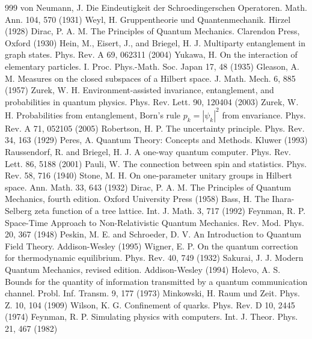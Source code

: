 \begin{thebibliography}{999}
 von Neumann, J. Die Eindeutigkeit der Schroedingerschen Operatoren. Math. Ann. 104, 570 (1931)
 Weyl, H. Gruppentheorie und Quantenmechanik. Hirzel (1928)
 Dirac, P. A. M. The Principles of Quantum Mechanics. Clarendon Press, Oxford (1930)
 Hein, M., Eisert, J., and Briegel, H. J. Multiparty entanglement in graph states. Phys. Rev. A 69, 062311 (2004)
 Yukawa, H. On the interaction of elementary particles. I. Proc. Phys.-Math. Soc. Japan 17, 48 (1935)
 Gleason, A. M. Measures on the closed subspaces of a Hilbert space. J. Math. Mech. 6, 885 (1957)
 Zurek, W. H. Environment-assisted invariance, entanglement, and probabilities in quantum physics. Phys. Rev. Lett. 90, 120404 (2003)
 Zurek, W. H. Probabilities from entanglement, Born's rule $p_k=|\psi_k|^2$ from envariance. Phys. Rev. A 71, 052105 (2005)
 Robertson, H. P. The uncertainty principle. Phys. Rev. 34, 163 (1929)
 Peres, A. Quantum Theory: Concepts and Methods. Kluwer (1993)
 Raussendorf, R. and Briegel, H. J. A one-way quantum computer. Phys. Rev. Lett. 86, 5188 (2001)
 Pauli, W. The connection between spin and statistics. Phys. Rev. 58, 716 (1940)
 Stone, M. H. On one-parameter unitary groups in Hilbert space. Ann. Math. 33, 643 (1932)
 Dirac, P. A. M. The Principles of Quantum Mechanics, fourth edition. Oxford University Press (1958)
 Bass, H. The Ihara-Selberg zeta function of a tree lattice. Int. J. Math. 3, 717 (1992)
 Feynman, R. P. Space-Time Approach to Non-Relativistic Quantum Mechanics. Rev. Mod. Phys. 20, 367 (1948)
 Peskin, M. E. and Schroeder, D. V. An Introduction to Quantum Field Theory. Addison-Wesley (1995)
 Wigner, E. P. On the quantum correction for thermodynamic equilibrium. Phys. Rev. 40, 749 (1932)
 Sakurai, J. J. Modern Quantum Mechanics, revised edition. Addison-Wesley (1994)
 Holevo, A. S. Bounds for the quantity of information transmitted by a quantum communication channel. Probl. Inf. Transm. 9, 177 (1973)
 Minkowski, H. Raum und Zeit. Phys. Z. 10, 104 (1909)
 Wilson, K. G. Confinement of quarks. Phys. Rev. D 10, 2445 (1974)
 Feynman, R. P. Simulating physics with computers. Int. J. Theor. Phys. 21, 467 (1982)

\end{thebibliography}

